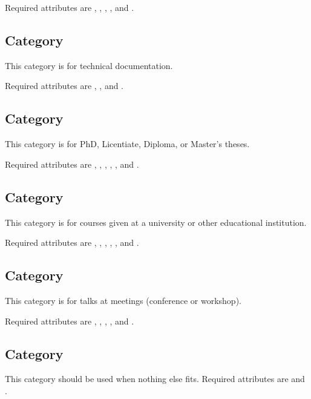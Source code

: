 Required attributes are , , ,
, and .

\subsection{Category }

This category is for technical documentation.

Required attributes are , , and .

\subsection{Category }

This category is for PhD, Licentiate, Diploma, or Master's theses.

Required attributes are , , ,
, , and .

\subsection{Category }

This category is for courses given at a university or other
educational institution.

Required attributes are , , ,
, , and .

\subsection{Category }

This category is for talks at meetings (conference or workshop).

Required attributes are , , , , and .

\subsection{Category }

This category should be used when nothing else fits. Required attributes are
 and .
